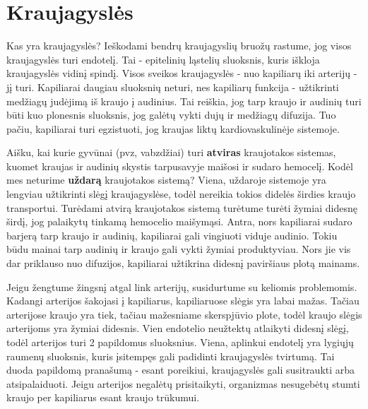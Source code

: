 \documentclass[]{book}
\begin{document}
\hypertarget{kraujagysles}{%
\section{Kraujagyslės}\label{kraujagysles}}

Kas yra kraujagyslės? Ieškodami bendrų kraujagyslių bruožų rastume, jog visos kraujagyslės turi endotelį. Tai - epitelinių ląstelių sluoksnis, kuris iškloja kraujagyslės vidinį spindį. Visos sveikos kraujagyslės - nuo kapiliarų iki arterijų - jį turi. Kapiliarai daugiau sluoksnių neturi, nes kapiliarų funkcija - užtikrinti medžiagų judėjimą iš kraujo į audinius. Tai reiškia, jog tarp kraujo ir audinių turi būti kuo plonesnis sluoksnis, jog galėtų vykti dujų ir medžiagų difuzija. Tuo pačiu, kapiliarai turi egzistuoti, jog kraujas liktų kardiovaskulinėje sistemoje.

Aišku, kai kurie gyvūnai (pvz, vabzdžiai) turi \textbf{atviras} kraujotakos sistemas, kuomet kraujas ir audinių skystis tarpusavyje maišosi ir sudaro hemocelį. Kodėl mes neturime \textbf{uždarą} kraujotakos sistemą? Viena, uždaroje sistemoje yra lengviau užtikrinti slėgį kraujagyslėse, todėl nereikia tokios didelės širdies kraujo transportui. Turėdami atvirą kraujotakos sistemą turėtume turėti žymiai didesnę širdį, jog palaikytų tinkamą hemocelio maišymąsi. Antra, nors kapiliarai sudaro barjerą tarp kraujo ir audinių, kapiliarai gali vingiuoti viduje audinio. Tokiu būdu mainai tarp audinių ir kraujo gali vykti žymiai produktyviau. Nors jie vis dar priklauso nuo difuzijos, kapiliarai užtikrina didesnį paviršiaus plotą mainams.

Jeigu žengtume žingsnį atgal link arterijų, susidurtume su keliomis problemomis. Kadangi arterijos šakojasi į kapiliarus, kapiliaruose slėgis yra labai mažas. Tačiau arterijose kraujo yra tiek, tačiau mažesniame skerspjūvio plote, todėl kraujo slėgis arterijoms yra žymiai didesnis. Vien endotelio neužtektų atlaikyti didesnį slėgį, todėl arterijos turi 2 papildomus sluoksnius. Viena, aplinkui endotelį yra lygiųjų raumenų sluoksnis, kuris įsitempęs gali padidinti kraujagyslės tvirtumą. Tai duoda papildomą pranašumą - esant poreikiui, kraujagyslės gali susitraukti arba atsipalaiduoti. Jeigu arterijos negalėtų prisitaikyti, organizmas nesugebėtų stumti kraujo per kapiliarus esant kraujo trūkumui.

\hypertarget{section}{%
\section{}\label{section}}
\end{document}
